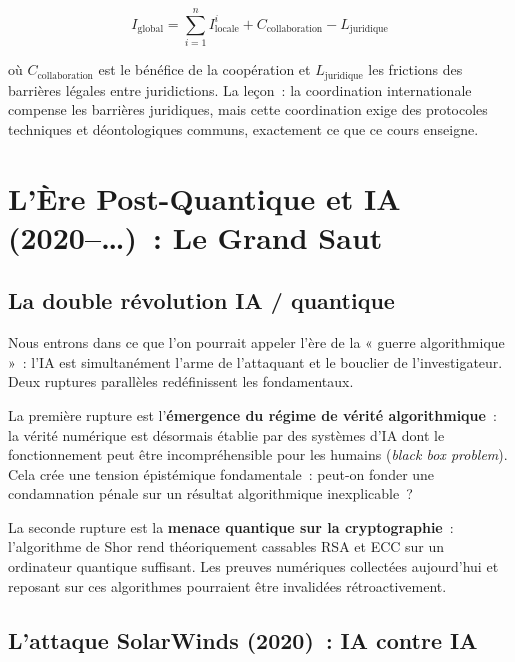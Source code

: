 \begin{equation}
I_{\text{global}} = \sum_{i=1}^{n} I_{\text{locale}}^{i} +
C_{\text{collaboration}} - L_{\text{juridique}}
\label{eq:investigation-globale}
\end{equation}

où $C_{\text{collaboration}}$ est le bénéfice de la coopération et
$L_{\text{juridique}}$ les frictions des barrières légales entre juridictions.
La leçon~: la coordination internationale compense les barrières juridiques,
mais cette coordination exige des protocoles techniques et déontologiques
communs, exactement ce que ce cours enseigne.

\section{L'Ère Post-Quantique et IA (2020--\ldots)~: Le Grand Saut}

\subsection{La double révolution IA / quantique}

Nous entrons dans ce que l'on pourrait appeler l'ère de la « guerre
algorithmique »~: l'IA est simultanément l'arme de l'attaquant et
le bouclier de l'investigateur. Deux ruptures parallèles redéfinissent
les fondamentaux.

\medskip

La première rupture est l'\textbf{émergence du régime de vérité algorithmique}~:
la vérité numérique est désormais établie par des systèmes d'IA dont le
fonctionnement peut être incompréhensible pour les humains (\textit{black box
problem}). Cela crée une tension épistémique fondamentale~: peut-on fonder
une condamnation pénale sur un résultat algorithmique inexplicable~?

La seconde rupture est la \textbf{menace quantique sur la cryptographie}~:
l'algorithme de Shor rend théoriquement cassables RSA et ECC sur un ordinateur
quantique suffisant. Les preuves numériques collectées aujourd'hui et
reposant sur ces algorithmes pourraient être invalidées rétroactivement.

\subsection{L'attaque SolarWinds (2020)~: IA contre IA}

